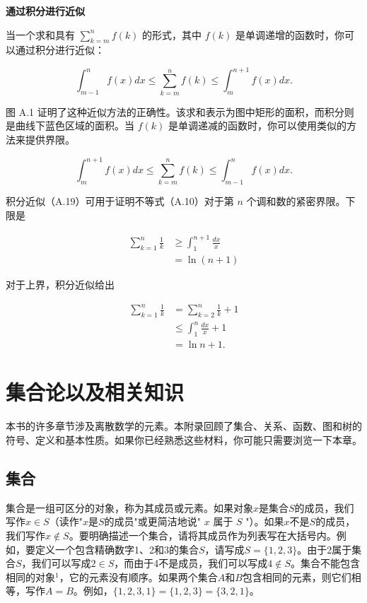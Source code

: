 \documentclass[lang=cn,newtx,10pt,scheme=chinese]{elegantbook}
\begin{document}
\textbf{通过积分进行近似}

当一个求和具有 $\sum_{k=m}^n f(k)$ 的形式，其中 $f(k)$ 是单调递增的函数时，你可以通过积分进行近似：

$$
\int_{m-1}^n f(x) d x \leq \sum_{k=m}^n f(k) \leq \int_m^{n+1} f(x) d x .
$$

图 A.1 证明了这种近似方法的正确性。该求和表示为图中矩形的面积，而积分则是曲线下蓝色区域的面积。当 $f(k)$ 是单调递减的函数时，你可以使用类似的方法来提供界限。

$$
\int_m^{n+1} f(x) d x \leq \sum_{k=m}^n f(k) \leq \int_{m-1}^n f(x) d x .
$$

积分近似（A.19）可用于证明不等式（A.10）对于第 $n$ 个调和数的紧密界限。下限是

$$
\begin{aligned}
\sum_{k=1}^n \frac{1}{k} & \geq \int_1^{n+1} \frac{d x}{x} \\
& =\ln (n+1)
\end{aligned}
$$

对于上界，积分近似给出

$$
\begin{aligned}
\sum_{k=1}^n \frac{1}{k} & =\sum_{k=2}^n \frac{1}{k}+1 \\
& \leq \int_1^n \frac{d x}{x}+1 \\
& =\ln n+1 .
\end{aligned}
$$

\chapter{集合论以及相关知识}

本书的许多章节涉及离散数学的元素。本附录回顾了集合、关系、函数、图和树的符号、定义和基本性质。如果你已经熟悉这些材料，你可能只需要浏览一下本章。

\section{集合}

集合是一组可区分的对象，称为其成员或元素。如果对象$x$是集合$S$的成员，我们写作$x \in S$（读作"$x$是$S$的成员"或更简洁地说" $x$ 属于 $S$ "）。如果$x$不是$S$的成员，我们写作$x \notin S$。要明确描述一个集合，请将其成员作为列表写在大括号内。例如，要定义一个包含精确数字1、2和3的集合$S$，请写成$S=\{1,2,3\}$。由于2属于集合$S$，我们可以写成$2 \in S$，而由于4不是成员，我们可以写成$4 \notin S$。集合不能包含相同的对象${ }^1$，它的元素没有顺序。如果两个集合$A$和$B$包含相同的元素，则它们相等，写作$A=B$。例如，$\{1,2,3,1\}=\{1,2,3\}=\{3,2,1\}$。
\end{document}
